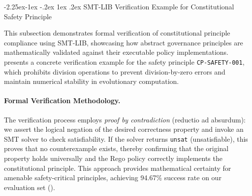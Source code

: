 \documentclass[manuscript,screen,9pt]{acmart}
\makeatletter
\renewcommand\subsection{\@startsection{subsection}{2}{\z@}%
  {-2.25ex\@plus -1ex \@minus -.2ex}%
  {1ex \@plus .2ex}%
  {\normalfont\large\bfseries}}
\makeatother
\begin{document}
\subsection{SMT-LIB Verification Example for Constitutional Safety Principle}
\label{subsubsec:smtlib_verification_example}

This subsection demonstrates formal verification of constitutional principle compliance using SMT-LIB, showcasing how abstract governance principles are mathematically validated against their executable policy implementations.  presents a concrete verification example for the safety principle \texttt{CP-SAFETY-001}, which prohibits division operations to prevent division-by-zero errors and maintain numerical stability in evolutionary computation.

\paragraph{Formal Verification Methodology.} The verification process employs \textit{proof by contradiction} (reductio ad absurdum): we assert the logical negation of the desired correctness property and invoke an SMT solver to check satisfiability. If the solver returns \texttt{unsat} (unsatisfiable), this proves that no counterexample exists, thereby confirming that the original property holds universally and the Rego policy correctly implements the constitutional principle. This approach provides mathematical certainty for amenable safety-critical principles, achieving 94.67\% success rate on our evaluation set ().
\end{document}
